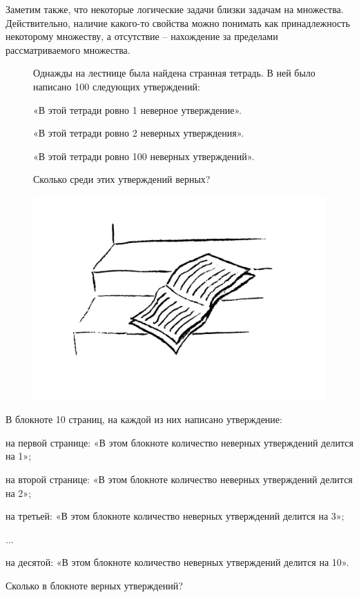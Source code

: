 Заметим также, что некоторые логические задачи близки задачам на множества. Действительно, наличие какого-то свойства можно понимать как принадлежность некоторому множеству, а отсутствие – нахождение за пределами рассматриваемого множества.

\begin{figure}[H]
\begin{minipage}{0.64\linewidth}\setlength{\parindent}{1.5em}
    \begin{thm}
        Однажды на лестнице была найдена странная тетрадь. В ней было написано 100 следующих утверждений:
        \par
        «В этой тетради ровно 1 неверное утверждение».
        \par
        «В этой тетради ровно 2 неверных утверждения».
        \par
        «В этой тетради ровно 100 неверных утверждений».
        \par
        Сколько среди этих утверждений верных?
    \end{thm}
\end{minipage}
\hfill
\begin{minipage}{0.25\linewidth}
    \includegraphics[width=0.95\columnwidth]{img/7.0 1 kniga.jpg}
\end{minipage}
\end{figure} 

\begin{thm}
    В блокноте 10 страниц, на каждой из них написано утверждение: 
    \par
    на первой странице: «В этом блокноте количество неверных утверждений делится на 1»;
    \par
    на второй странице: «В этом блокноте количество неверных утверждений делится на 2»;
    \par
    на третьей: «В этом блокноте количество неверных утверждений делится на 3»;
    \par
    ...
    \par
    на десятой: «В этом блокноте количество неверных утверждений делится на 10».
    \par
    Сколько в блокноте верных утверждений?
\end{thm}

